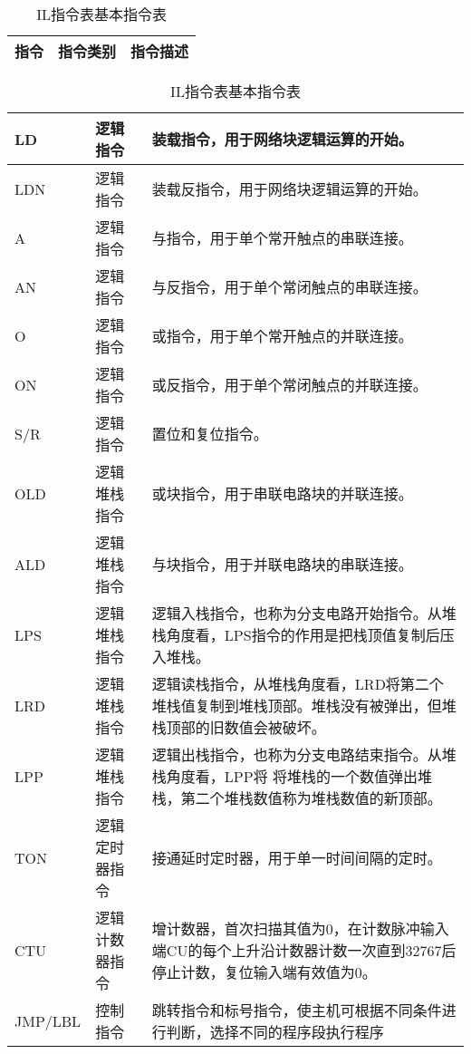 \begin{table}[!htp]
\centering
\caption{IL指令表基本指令表}
\label{spec:il}
\begin{tabular}{|p{1cm}<{\centering}|p{3cm}<{\centering}|p{8cm}<{\centering}|}
\hline
指令 & 指令类别 & 指令描述 \\
\hline
\end{tabular}
\begin{tabular}{|p{2cm}|p{3cm}|p{8cm}|}
\hline
LD & 逻辑指令 & 装载指令，用于网络块逻辑运算的开始。 \\
\hline
LDN & 逻辑指令 & 装载反指令，用于网络块逻辑运算的开始。 \\
\hline
A & 逻辑指令 & 与指令，用于单个常开触点的串联连接。 \\
\hline
AN & 逻辑指令 & 与反指令，用于单个常闭触点的串联连接。 \\
\hline
O & 逻辑指令 & 或指令，用于单个常开触点的并联连接。 \\
\hline
ON & 逻辑指令 & 或反指令，用于单个常闭触点的并联连接。 \\
\hline
S/R & 逻辑指令 & 置位和复位指令。 \\
\hline
OLD & 逻辑堆栈指令 & 或块指令，用于串联电路块的并联连接。 \\
\hline
ALD & 逻辑堆栈指令 & 与块指令，用于并联电路块的串联连接。 \\
\hline
LPS & 逻辑堆栈指令 & 逻辑入栈指令，也称为分支电路开始指令。从堆栈角度看，LPS指令的作用是把栈顶值复制后压入堆栈。\\
\hline
LRD & 逻辑堆栈指令 & 逻辑读栈指令，从堆栈角度看，LRD将第二个堆栈值复制到堆栈顶部。堆栈没有被弹出，但堆栈顶部的旧数值会被破坏。
\\
\hline
LPP & 逻辑堆栈指令 & 逻辑出栈指令，也称为分支电路结束指令。从堆栈角度看，LPP将
将堆栈的一个数值弹出堆栈，第二个堆栈数值称为堆栈数值的新顶部。\\
\hline
TON & 逻辑定时器指令 & 接通延时定时器，用于单一时间间隔的定时。 \\
\hline
CTU & 逻辑计数器指令 & 增计数器，首次扫描其值为0，在计数脉冲输入端CU的每个上升沿计数器计数一次直到32767后停止计数，复位输入端有效值为0。 \\
\hline
JMP/LBL & 控制指令 & 跳转指令和标号指令，使主机可根据不同条件进行判断，选择不同的程序段执行程序 \\
\hline

\end{tabular}
\end{table}

